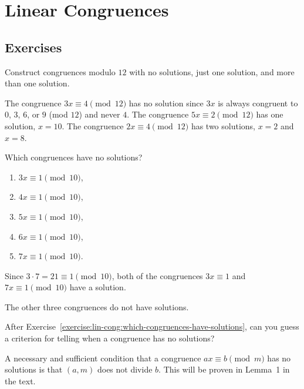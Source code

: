 \chapter{Linear Congruences}

\section{Exercises}

 Construct congruences modulo $12$ with no solutions, just
one solution, and more than one solution.
\begin{solution}
  The congruence $3x\equiv4\pmod{12}$ has no solution since $3x$ is
  always congruent to $0$, $3$, $6$, or $9$ (mod $12$) and never
  $4$. The congruence $5x\equiv2\pmod{12}$ has one solution, $x =
  10$. The congruence $2x\equiv4\pmod{12}$ has two solutions, $x = 2$
  and $x = 8$.
\end{solution}

 Which congruences have no solutions?
\label{exercise:lin-cong:which-congruences-have-solutions}
\begin{enumerate}
\item $3x\equiv1\pmod{10}$,
\item $4x\equiv1\pmod{10}$,
\item $5x\equiv1\pmod{10}$,
\item $6x\equiv1\pmod{10}$,
\item $7x\equiv1\pmod{10}$.
\end{enumerate}
\begin{solution}
  Since $3\cdot7 = 21\equiv1\pmod{10}$, both of the congruences
  $3x\equiv1$ and $7x\equiv1\pmod{10}$ have a solution.

  The other three congruences do not have solutions.
\end{solution}

 After
Exercise~\ref{exercise:lin-cong:which-congruences-have-solutions}, can
you guess a criterion for telling when a congruence has no solutions?
\begin{solution}
  A necessary and sufficient condition that a congruence
  $ax\equiv b\pmod{m}$ has no solutions is that $(a,m)$ does not
  divide $b$. This will be proven in Lemma~1 in the text.
\end{solution}

